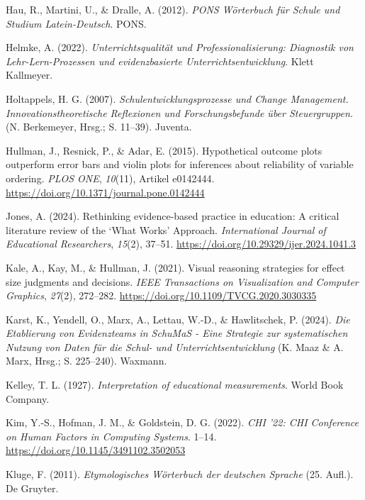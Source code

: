 \documentclass[
  jou,
  floatsintext,
  longtable,
  nolmodern,
  notxfonts,
  notimes,
  colorlinks=true,linkcolor=blue,citecolor=blue,urlcolor=blue]{apa7}
\newlength{\cslhangindent}
\newenvironment{CSLReferences}[2] %
 {\begin{list}{}{%
  \setlength{\itemindent}{0pt}
  \setlength{\leftmargin}{0pt}
  \setlength{\parsep}{0pt}
  \ifodd #1
   \setlength{\leftmargin}{\cslhangindent}
   \setlength{\itemindent}{-1\cslhangindent}
  \fi
  \setlength{\itemsep}{#2\baselineskip}}}
 {\end{list}}
\begin{document}
\begin{CSLReferences}{1}{0}
Hau, R., Martini, U., \& Dralle, A. (2012). \emph{PONS Wörterbuch für
Schule und Studium Latein-Deutsch}. PONS.

Helmke, A. (2022). \emph{Unterrichtsqualität und Professionalisierung:
Diagnostik von Lehr-Lern-Prozessen und evidenzbasierte
Unterrichtsentwicklung}. Klett Kallmeyer.

Holtappels, H. G. (2007). \emph{Schulentwicklungsprozesse und Change
Management. Innovationstheoretische Reflexionen und Forschungsbefunde
über Steuergruppen.} (N. Berkemeyer, Hrsg.; S. 11--39). Juventa.

Hullman, J., Resnick, P., \& Adar, E. (2015). Hypothetical outcome plots
outperform error bars and violin plots for inferences about reliability
of variable ordering. \emph{PLOS ONE}, \emph{10}(11), Artikel e0142444.
\url{https://doi.org/10.1371/journal.pone.0142444}

Jones, A. (2024). Rethinking evidence-based practice in education: A
critical literature review of the {`}What Works{'} Approach.
\emph{International Journal of Educational Researchers}, \emph{15}(2),
37--51. \url{https://doi.org/10.29329/ijer.2024.1041.3}

Kale, A., Kay, M., \& Hullman, J. (2021). Visual reasoning strategies
for effect size judgments and decisions. \emph{IEEE Transactions on
Visualization and Computer Graphics}, \emph{27}(2), 272--282.
\url{https://doi.org/10.1109/TVCG.2020.3030335}

Karst, K., Yendell, O., Marx, A., Lettau, W.-D., \& Hawlitschek, P.
(2024). \emph{Die Etablierung von Evidenzteams in SchuMaS - Eine
Strategie zur systematischen Nutzung von Daten für die Schul- und
Unterrichtsentwicklung} (K. Maaz \& A. Marx, Hrsg.; S. 225--240).
Waxmann.

Kelley, T. L. (1927). \emph{Interpretation of educational measurements}.
World Book Company.

Kim, Y.-S., Hofman, J. M., \& Goldstein, D. G. (2022). \emph{CHI '22:
CHI Conference on Human Factors in Computing Systems}. 1--14.
\url{https://doi.org/10.1145/3491102.3502053}

Kluge, F. (2011). \emph{Etymologisches Wörterbuch der deutschen Sprache}
(25. Aufl.). De Gruyter.


\end{CSLReferences}
\end{document}
